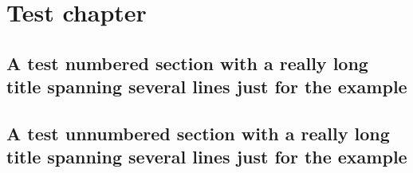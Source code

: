 \documentclass[10pt,A4]{article}
\begin{document}
\chapter{Test chapter}
\section{A test numbered section with a really long title spanning several lines just for the example}
\lipsum[4]
\section*{A test unnumbered section with a really long title spanning several lines just for the example}
\lipsum[4]
\end{document}
